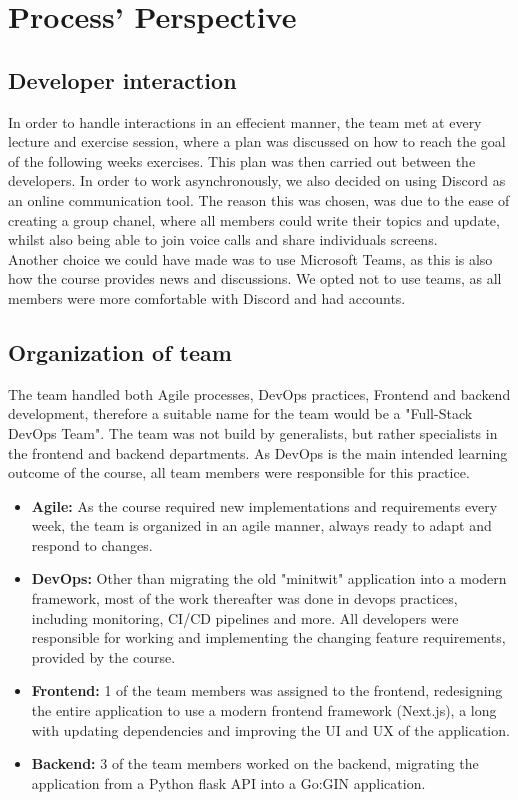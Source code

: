 \section{Process' Perspective}

\subsection{Developer interaction}
In order to handle interactions in an effecient manner, the team met at every lecture and exercise session, where a plan was discussed on how to reach the goal of the following weeks exercises. This plan was then carried out between the developers. In order to work asynchronously, we also decided on using Discord as an online communication tool. The reason this was chosen, was due to the ease of creating a group chanel, where all members could write their topics and update, whilst also being able to join voice calls and share individuals screens. 
\\
Another choice we could have made was to use Microsoft Teams, as this is also how the course provides news and discussions. We opted not to use teams, as all members were more comfortable with Discord and had accounts.

\subsection{Organization of team}\label{subsec:organization_of_team}
The team handled both Agile processes, DevOps practices, Frontend and backend development, therefore a suitable name for the team would be a "Full-Stack DevOps Team". The team was not build by generalists, but rather specialists in the frontend and backend departments. As DevOps is the main intended learning outcome of the course, all team members were responsible for this practice.
\begin{itemize}
    \item \textbf{Agile:} As the course required new implementations and requirements every week, the team is organized in an agile manner, always ready to adapt and respond to changes.
    \item \textbf{DevOps:} Other than migrating the old "minitwit" application into a modern framework, most of the work thereafter was done in devops practices, including monitoring, CI/CD pipelines and more. All developers were responsible for working and implementing the changing feature requirements, provided by the course.
    \item \textbf{Frontend:} 1 of the team members was assigned to the frontend, redesigning the entire application to use a modern frontend framework (Next.js), a long with updating dependencies and improving the UI and UX of the application.
    \item \textbf{Backend:} 3 of the team members worked on the backend, migrating the application from a Python flask API into a Go:GIN application.
\end{itemize}

